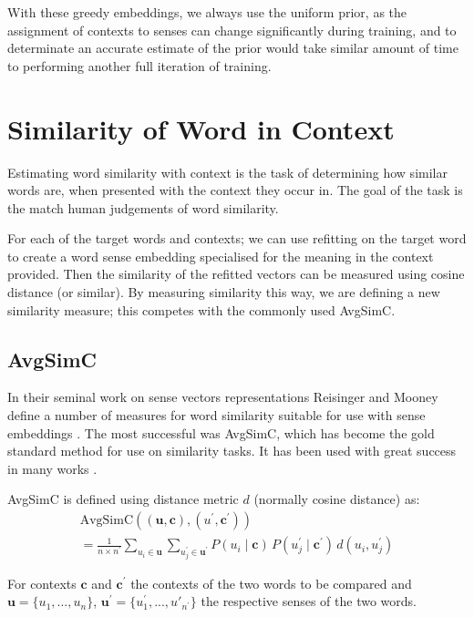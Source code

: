 \documentclass{sig-alternate}
\renewcommand{\c}{\mathbf{c}}
\renewcommand{\u}{\mathbf{u}}
\begin{document}
With these greedy embeddings, we always use the uniform prior, as the assignment of contexts  to senses can change significantly during training, and to determinate an accurate estimate of the prior would take similar amount of time to performing another full iteration of training.



\section{Similarity of Word in Context} \label{SimilarityInContext}
Estimating word similarity with context is the task of determining how similar words are, when presented with the context they occur in. The goal of the task is the match human judgements of word similarity.

For each of the target words and contexts; we can use refitting on the target word to create a word sense embedding specialised for the meaning in the context provided. Then the similarity of the refitted vectors can be measured using cosine distance (or similar).
By measuring similarity this way, we are defining a new similarity measure; this competes with the commonly used AvgSimC.

\subsection{AvgSimC}
In their seminal work on sense vectors representations Reisinger and Mooney define a number of measures for word similarity suitable for use with sense embeddings \parencite{Reisinger2010}. The most successful was AvgSimC, which has become the gold standard method for use on similarity tasks. It has been used with great success in many works \cite{Huang2012, Chen2014, tian2014probabilistic}. 


AvgSimC is defined using distance metric $d$ (normally cosine distance) as: 
\begin{multline} \label{eq:avgsimc}
\mathrm{AvgSimC}((\u,\c),(u^{\prime},\c^{\prime})) \\
=  \frac{1}{n \times n^{\prime}}
\sum_{u_{i}\in\u}
\sum_{u_{j}^{\prime}\in\u^{\prime}}
P(u_{i}\mid\c)\,P(u_{j}^{\prime}\mid\c^{\prime})\,d(u_{i},u_{j}^{\prime})
\end{multline}

For contexts $\c$ and $\c^\prime$ the contexts of the two words to be compared and  $\u=\{u_1,...,u_n\}$, $\u^\prime=\{u^\prime_1,...,u\prime_{n^\prime}\}$ the respective senses of the two words.
\end{document}
